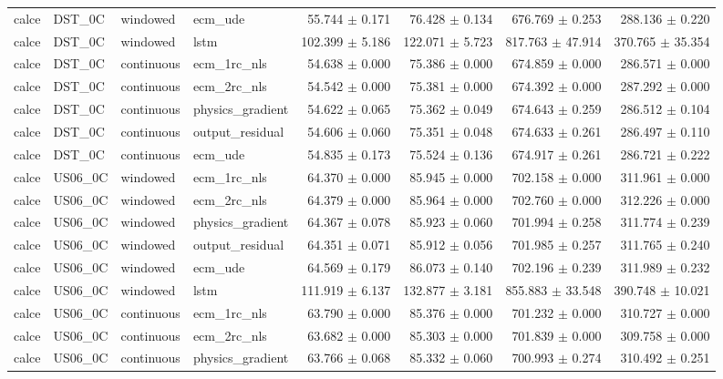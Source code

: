 \begin{longtable}{llllrrrr}
calce & DST\_0C & windowed & ecm\_ude & 55.744 $\pm$ 0.171 & 76.428 $\pm$ 0.134 & 676.769 $\pm$ 0.253 & 288.136 $\pm$ 0.220 \\
calce & DST\_0C & windowed & lstm & 102.399 $\pm$ 5.186 & 122.071 $\pm$ 5.723 & 817.763 $\pm$ 47.914 & 370.765 $\pm$ 35.354 \\
calce & DST\_0C & continuous & ecm\_1rc\_nls & 54.638 $\pm$ 0.000 & 75.386 $\pm$ 0.000 & 674.859 $\pm$ 0.000 & 286.571 $\pm$ 0.000 \\
calce & DST\_0C & continuous & ecm\_2rc\_nls & 54.542 $\pm$ 0.000 & 75.381 $\pm$ 0.000 & 674.392 $\pm$ 0.000 & 287.292 $\pm$ 0.000 \\
calce & DST\_0C & continuous & physics\_gradient & 54.622 $\pm$ 0.065 & 75.362 $\pm$ 0.049 & 674.643 $\pm$ 0.259 & 286.512 $\pm$ 0.104 \\
calce & DST\_0C & continuous & output\_residual & 54.606 $\pm$ 0.060 & 75.351 $\pm$ 0.048 & 674.633 $\pm$ 0.261 & 286.497 $\pm$ 0.110 \\
calce & DST\_0C & continuous & ecm\_ude & 54.835 $\pm$ 0.173 & 75.524 $\pm$ 0.136 & 674.917 $\pm$ 0.261 & 286.721 $\pm$ 0.222 \\
calce & US06\_0C & windowed & ecm\_1rc\_nls & 64.370 $\pm$ 0.000 & 85.945 $\pm$ 0.000 & 702.158 $\pm$ 0.000 & 311.961 $\pm$ 0.000 \\
calce & US06\_0C & windowed & ecm\_2rc\_nls & 64.379 $\pm$ 0.000 & 85.964 $\pm$ 0.000 & 702.760 $\pm$ 0.000 & 312.226 $\pm$ 0.000 \\
calce & US06\_0C & windowed & physics\_gradient & 64.367 $\pm$ 0.078 & 85.923 $\pm$ 0.060 & 701.994 $\pm$ 0.258 & 311.774 $\pm$ 0.239 \\
calce & US06\_0C & windowed & output\_residual & 64.351 $\pm$ 0.071 & 85.912 $\pm$ 0.056 & 701.985 $\pm$ 0.257 & 311.765 $\pm$ 0.240 \\
calce & US06\_0C & windowed & ecm\_ude & 64.569 $\pm$ 0.179 & 86.073 $\pm$ 0.140 & 702.196 $\pm$ 0.239 & 311.989 $\pm$ 0.232 \\
calce & US06\_0C & windowed & lstm & 111.919 $\pm$ 6.137 & 132.877 $\pm$ 3.181 & 855.883 $\pm$ 33.548 & 390.748 $\pm$ 10.021 \\
calce & US06\_0C & continuous & ecm\_1rc\_nls & 63.790 $\pm$ 0.000 & 85.376 $\pm$ 0.000 & 701.232 $\pm$ 0.000 & 310.727 $\pm$ 0.000 \\
calce & US06\_0C & continuous & ecm\_2rc\_nls & 63.682 $\pm$ 0.000 & 85.303 $\pm$ 0.000 & 701.839 $\pm$ 0.000 & 309.758 $\pm$ 0.000 \\
calce & US06\_0C & continuous & physics\_gradient & 63.766 $\pm$ 0.068 & 85.332 $\pm$ 0.060 & 700.993 $\pm$ 0.274 & 310.492 $\pm$ 0.251 \\

\end{longtable}
